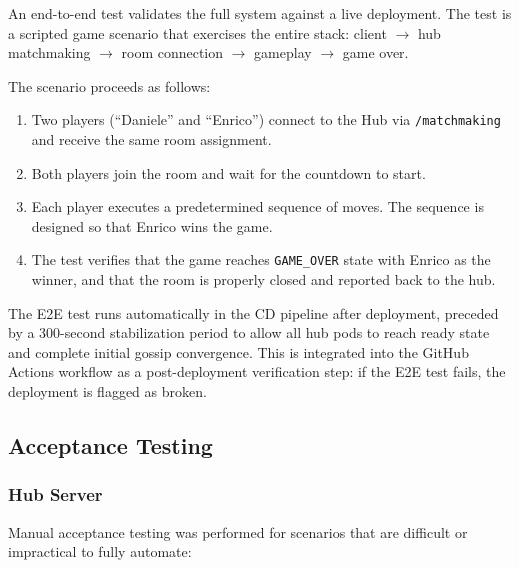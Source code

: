 An end-to-end test validates the full system against a live deployment.
The test is a scripted game scenario that exercises the entire stack: client $\rightarrow$ hub matchmaking $\rightarrow$ room connection $\rightarrow$ gameplay $\rightarrow$ game over.

The scenario proceeds as follows:
\begin{enumerate}
    \item Two players (``Daniele'' and ``Enrico'') connect to the Hub via \texttt{/matchmaking} and receive the same room assignment.
    \item Both players join the room and wait for the countdown to start.
    \item Each player executes a predetermined sequence of moves. The sequence is designed so that Enrico wins the game.
    \item The test verifies that the game reaches \texttt{GAME\_OVER} state with Enrico as the winner, and that the room is properly closed and reported back to the hub.
\end{enumerate}

The E2E test runs automatically in the CD pipeline after deployment, preceded by a 300-second stabilization period to allow all hub pods to reach ready state and complete initial gossip convergence.
This is integrated into the GitHub Actions workflow as a post-deployment verification step: if the E2E test fails, the deployment is flagged as broken.

\subsection{Acceptance Testing}\label{acceptance-test}

\subsubsection{Hub Server}

Manual acceptance testing was performed for scenarios that are difficult or impractical to fully automate:

